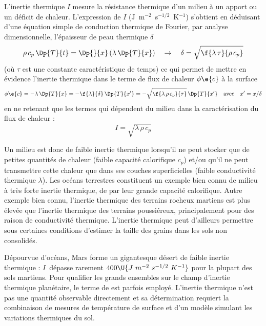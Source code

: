 L'inertie thermique $I$ mesure la résistance
thermique d'un milieu à un apport ou un
déficit de chaleur.
%
L'expression de $I$ (J~m$^{-2}$~s$^{-1/2}$~K$^{-1}$) 
s'obtient en déduisant d'une équation
simple de conduction thermique de Fourier,
par analyse dimensionnelle, l'épaisseur
de peau thermique $\delta$ 
%
\[
\rho \, c_p \, \Dp{T}{t} = \Dp{}{x} \left( \lambda \, \Dp{T}{x} \right)
\quad
\to
\quad
\delta = \sqrt{\f{\lambda \, \tau}{\rho \, c_p}}
\]
%
\noindent (où $\tau$ est une constante caractéristique de temps)
ce qui permet de mettre en évidence l'inertie
thermique dans le terme de flux de chaleur $\phi\e{c}$
à la surface
%
\[
\phi\e{c} = - \lambda \, \Dp{T}{x} = - \f{\lambda}{\delta} \, \Dp{T}{x'} 
= - \sqrt{\f{\lambda \, \rho \, c_p}{\tau}} \, \Dp{T}{x'}
\quad 
\textrm{avec}
\quad
x'=x/\delta 
\]
\noindent en ne retenant que les termes qui dépendent du milieu
dans la caractérisation du flux de chaleur :
%
\[
I = \sqrt{\lambda \, \rho \, c_p}
\]


Un milieu est donc de faible inertie thermique
lorsqu'il ne peut stocker que de petites quantités de chaleur
(faible capacité calorifique $c_p$)
et/ou qu'il ne peut transmettre cette chaleur que dans ses couches superficielles
(faible conductivité thermique $\lambda$).
%
Les océans terrestres constituent un exemple 
bien connu de milieu à très forte inertie thermique, 
de par leur grande capacité calorifique.
%
Autre exemple bien connu, 
l'inertie thermique des terrains rocheux
martiens est plus élevée que 
l'inertie thermique des terrains
poussiéreux, principalement
pour des raison de conductivité thermique.
%
L'inertie thermique
peut d'ailleurs permettre 
sous certaines conditions d'estimer
la taille des grains dans les sols
non consolidés.

Dépourvue d'océans, Mars forme
un gigantesque désert de faible inertie
thermique : $I$~dépasse 
rarement $400\U{J~m^{-2}~s^{-1/2}~K^{-1}}$
pour la plupart des sols martiens.
%
Pour qualifier les grands
ensembles sur le champ d'inertie
thermique planétaire,
le terme de 
est parfois employé.
%
L'inertie thermique n'est pas une
quantité observable directement
et sa détermination requiert la combinaison
de mesures de température de surface et
d'un modèle simulant les variations thermiques du sol.
